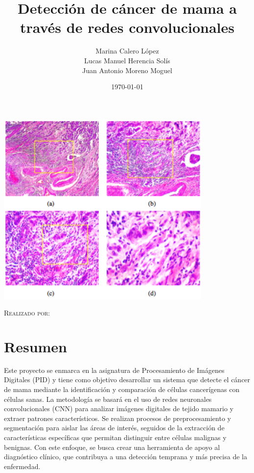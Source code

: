 \documentclass[12pt]{article} %
\title{Detección de cáncer de mama a través de redes convolucionales}
\author{Marina Calero López \\
Lucas Manuel Herencia Solís \\
Juan Antonio Moreno Moguel \\
}
\date{\today}
\newcommand{\customtitlefont}{\fontsize{40pt}{42pt}\selectfont\bfseries} %
\begin{document}
\begin{titlepage}
    \centering
    {\customtitlefont \thetitle \par} %
    \vspace{2cm}
    \includegraphics[width=0.8\textwidth]{logo.png}\par\vspace{1cm} %
    {\scshape\Large Realizado por:\par}
    \vspace{1cm}
    {\Large \theauthor\par}
    \vfill
    {\large \thedate\par}
\end{titlepage}

\section*{Resumen}
Este proyecto se enmarca en la asignatura de Procesamiento de Imágenes Digitales (PID) y tiene como objetivo desarrollar un sistema que detecte el cáncer de mama mediante la identificación y comparación de células cancerígenas con células sanas. La metodología se basará en el uso de redes neuronales convolucionales (CNN) para analizar imágenes digitales de tejido mamario y extraer patrones característicos. Se realizan procesos de preprocesamiento y segmentación para aislar las áreas de interés, seguidos de la extracción de características específicas que permitan distinguir entre células malignas y benignas. Con este enfoque, se busca crear una herramienta de apoyo al diagnóstico clínico, que contribuya a una detección temprana y más precisa de la enfermedad.
\end{document}
